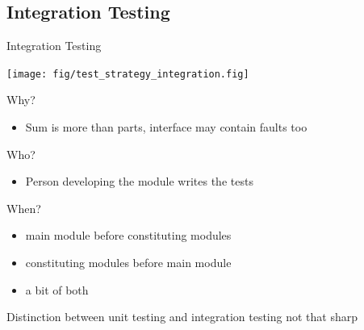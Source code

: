\subsection{Integration Testing}
\begin{frame}{Integration Testing}
  \centerline{\texttt{[image: fig/test\_strategy\_integration.fig]}}
  \begin{block}{Why?}
    \begin{itemize}
    \item Sum is more than parts, interface may contain faults too
    \end{itemize}
  \end{block}\vspace{-.5\baselineskip}
  \begin{block}{Who?}
    \begin{itemize}
    \item Person developing the module writes the tests
    \end{itemize}
  \end{block}\vspace{-.5\baselineskip}
  \begin{block}{When?}
    \begin{itemize}
    \item {} main module before constituting modules
    \item {} constituting modules before main module
    \item {} a bit of both
    \end{itemize}
  \end{block}\vspace{-.5\baselineskip}
   Distinction between unit testing and integration testing
  not that sharp
\end{frame}
